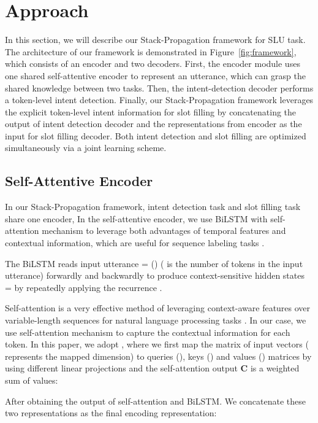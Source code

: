 \documentclass[11pt,a4paper]{article}
\begin{document}
\section{Approach}
In this section, we will describe our Stack-Propagation framework for SLU task.
The architecture of our framework is demonstrated in Figure~\ref{fig:framework}, 
which consists of an encoder and two decoders. 
First, the encoder module uses one shared self-attentive encoder to represent an utterance, which can grasp the shared knowledge between two tasks.
Then, the intent-detection decoder performs a token-level intent detection.
Finally, our Stack-Propagation framework leverages the explicit token-level intent information for slot filling 
by concatenating the output of intent detection decoder and the representations from encoder as the input for slot filling decoder. 
Both intent detection and slot filling are optimized simultaneously via a joint learning scheme.


\subsection{Self-Attentive Encoder}
In our Stack-Propagation framework, intent detection task and slot filling task share one encoder, 
In the self-attentive encoder, 
we use BiLSTM with self-attention mechanism to 
leverage both advantages of temporal features and contextual information, which 
are useful 
for sequence labeling tasks \cite{P18-1135,yin2018deep}.

The BiLSTM  \cite{hochreiter1997long} reads input utterance  = ()  ( is the 
number of tokens in the input utterance)  forwardly and backwardly to produce context-sensitive  hidden states  =  
by repeatedly applying the recurrence 
.


Self-attention is a very effective 
method of leveraging context-aware features over 
variable-length sequences for natural language 
processing tasks \cite{tan2018deep,P18-1135}. 
In our case, we use  self-attention mechanism to capture 
the contextual information for each token.
In this paper, we adopt \citet{NIPS2017_7181}, where
we first map the matrix of input vectors    
( represents the 
mapped dimension) to queries (), keys () and values 
() matrices by using different linear projections
and the self-attention output 
{\bf{C}}    is a weighted sum of values:


After obtaining the output of self-attention and 
BiLSTM. We concatenate these two representations as 
the final encoding representation:
\end{document}
